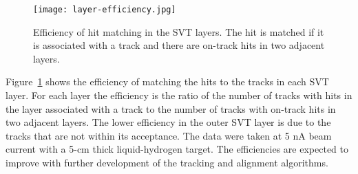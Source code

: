 \begin{figure}[hbt] 
\centering 
\texttt{[image: layer-efficiency.jpg]}
\caption{Efficiency of hit matching in the SVT layers. The hit is matched if it is associated with a track and there are on-track hits in two adjacent layers.}
\label{fig:layer-efficiency}
\end{figure}

Figure~\ref{fig:layer-efficiency} shows the efficiency of matching the hits to the tracks in each SVT layer. For each layer the efficiency is the ratio of the number of tracks with hits in the layer associated with a track to the number of tracks with on-track hits in two adjacent layers. The lower efficiency in the outer SVT layer is due to the tracks that are not within its acceptance. The data were taken at 5 nA beam current with a 5-cm thick liquid-hydrogen target. The efficiencies are expected to improve with further development of the tracking and alignment algorithms. 
